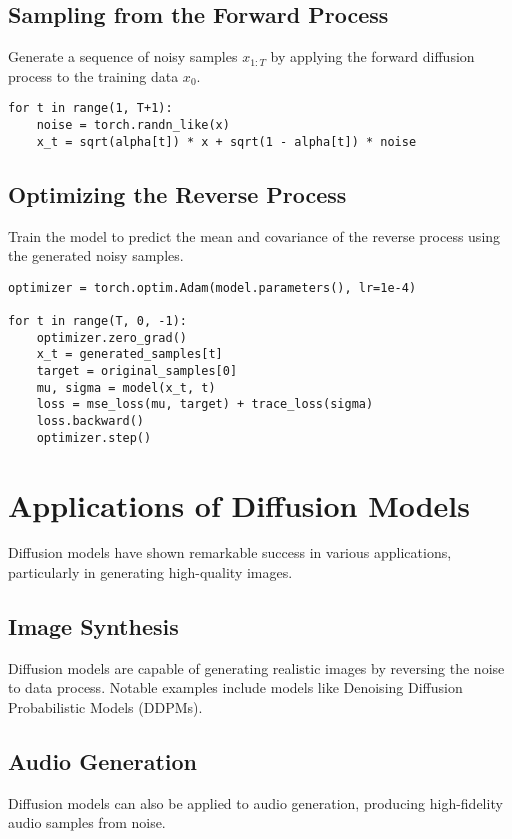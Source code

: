 \subsection{Sampling from the Forward Process}
Generate a sequence of noisy samples \( x_{1:T} \) by applying the forward diffusion process to the training data \( x_0 \).

\begin{verbatim}
for t in range(1, T+1):
    noise = torch.randn_like(x)
    x_t = sqrt(alpha[t]) * x + sqrt(1 - alpha[t]) * noise
\end{verbatim}

\subsection{Optimizing the Reverse Process}
Train the model to predict the mean and covariance of the reverse process using the generated noisy samples.

\begin{verbatim}
optimizer = torch.optim.Adam(model.parameters(), lr=1e-4)

for t in range(T, 0, -1):
    optimizer.zero_grad()
    x_t = generated_samples[t]
    target = original_samples[0]
    mu, sigma = model(x_t, t)
    loss = mse_loss(mu, target) + trace_loss(sigma)
    loss.backward()
    optimizer.step()
\end{verbatim}

\section{Applications of Diffusion Models}
Diffusion models have shown remarkable success in various applications, particularly in generating high-quality images.

\subsection{Image Synthesis}
Diffusion models are capable of generating realistic images by reversing the noise to data process. Notable examples include models like Denoising Diffusion Probabilistic Models (DDPMs).

\subsection{Audio Generation}
Diffusion models can also be applied to audio generation, producing high-fidelity audio samples from noise.

